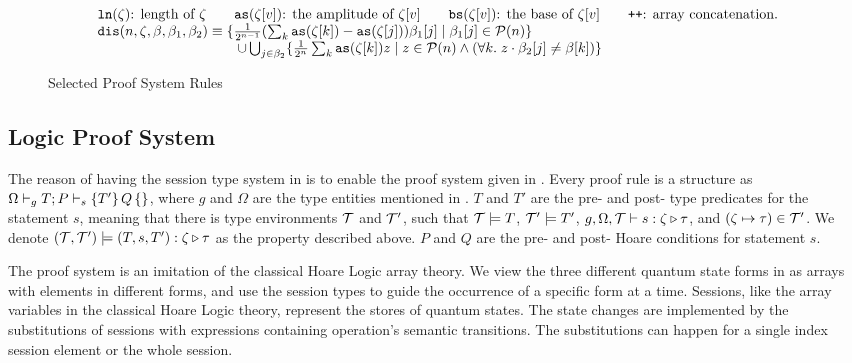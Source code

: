 {\begin{figure}[t]
{\begin{mathpar}
  \end{mathpar}
}
{\footnotesize
\[
\begin{array}{l}
\texttt{ln}(\zeta)\text{: length of }\zeta
\qquad
\texttt{as}(\zeta[v])\text{: the amplitude of }\zeta[v]
\qquad
\texttt{bs}(\zeta[v])\text{: the base of }\zeta[v]
\qquad
\texttt{++}\text{: array concatenation.}
\\
\texttt{dis}(n,\zeta,\beta,\beta_1,\beta_2)\equiv \{\frac{1}{2^{n-1}}(\sum_k \texttt{as}(\zeta[k])-\texttt{as}(\zeta[j]))\beta_1[j]
                           \;|\; \beta_1[j]\in \tpower{n} \}
\\
\qquad\qquad\qquad\qquad\qquad
\cup  \bigcup_{j\in \beta_2}\{\frac{1}{2^{n}}\sum_k \texttt{as}(\zeta[k])z
                           \;|\; z\in \tpower{n} \wedge (\forall k.\;z \cdot \beta_2[j] \neq \beta[k]) \}
\end{array}
\]
}
\caption{Selected Proof System Rules}
\label{fig:exp-proofsystem}
\end{figure}
}
\subsection{Logic Proof System}\label{sec:logical}


The reason of having the session type system in 
is to enable the proof system given in .
Every proof rule is a structure as $\Omega\vdash_g \fivepule{T}{P}{s}{T'}{Q}$,
where $g$ and $\Omega$ are the type entities mentioned in .
$T$ and $T'$ are the pre- and post- type predicates for the statement $s$, 
meaning that there is type environments $\itau$ and $\itau'$, such that $\itau\models T$,
$\itau'\models T'$, $g,\Omega,\itau \vdash s : \zeta\triangleright \tau$, and $(\zeta\mapsto \tau) \in \itau'$.
We denote $(\itau,\itau')\models (T,s,T'):\zeta\triangleright\tau$ as the property described above.
$P$ and $Q$ are the pre- and post- Hoare conditions for statement $s$.

The proof system is an imitation of the classical Hoare Logic array theory.
We view the three different quantum state forms in  as arrays with elements in different forms,
and use the session types to guide the occurrence of a specific form at a time.
Sessions, like the array variables in the classical Hoare Logic theory,
represent the stores of quantum states.
The state changes are implemented by the substitutions of sessions
with expressions containing operation's semantic transitions.
The substitutions can happen for a single index session element or the whole session.


